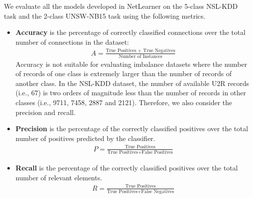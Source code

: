 
We evaluate all the models developed in NetLearner on the 5-class NSL-KDD task and the 2-class UNSW-NB15 task using the following metrics.
\begin{itemize}
    \item \textbf{Accuracy} is the percentage of correctly classified connections
        over the total number of connections in the dataset:
        \begin{align}
            A = \frac{\text{True Positives + True Negatives}}{\text{Number of Instances}}
        \end{align} 
        Accuracy is not suitable for evaluating imbalance datasets where the number
        of records of one class is extremely larger than the number of
        records of another class.
        In the NSL-KDD dataset, the number of available U2R records (i.e., 67)
        is two orders of magnitude less than the number of records in other classes
        (i.e., 9711, 7458, 2887 and 2121).
        Therefore, we also consider the precision and recall.
    \item \textbf{Precision} is the percentage of the correctly classified positives over
        the total number of positives predicted by the classifier.
                \begin{align}
                    P = \frac{\text{True Positives}}{\text{True Positives} + \text{False Positives}}
                \end{align}
    \item \textbf{Recall} is the percentage of the correctly classified positives over
                the total number of relevant elements.
                \begin{align}
                    R = \frac{\text{True Positives}}{\text{True Positives} + \text{False Negatives}}
                \end{align}
\end{itemize}

